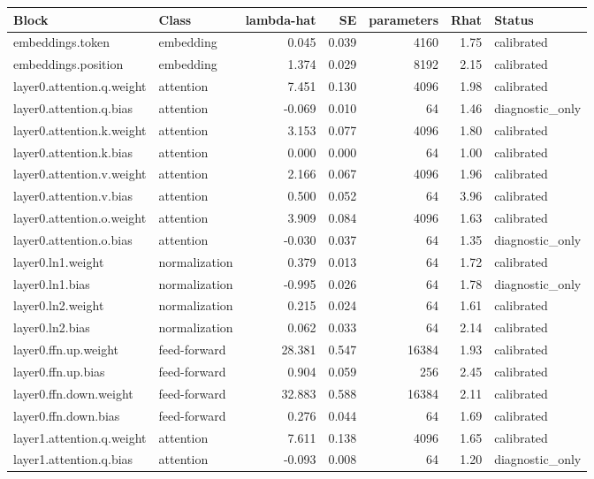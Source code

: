 \documentclass[11pt]{article}
\begin{document}
\small
\begin{longtable}{p{}p{}rrrrp{}}
\toprule
Block & Class & lambda-hat & SE & parameters & Rhat & Status \\
\midrule
\endhead
embeddings.token & embedding & 0.045 & 0.039 & 4160 & 1.75 & calibrated \\
embeddings.position & embedding & 1.374 & 0.029 & 8192 & 2.15 & calibrated \\
layer0.attention.q.weight & attention & 7.451 & 0.130 & 4096 & 1.98 & calibrated \\
layer0.attention.q.bias & attention & -0.069 & 0.010 & 64 & 1.46 & diagnostic\_only \\
layer0.attention.k.weight & attention & 3.153 & 0.077 & 4096 & 1.80 & calibrated \\
layer0.attention.k.bias & attention & 0.000 & 0.000 & 64 & 1.00 & calibrated \\
layer0.attention.v.weight & attention & 2.166 & 0.067 & 4096 & 1.96 & calibrated \\
layer0.attention.v.bias & attention & 0.500 & 0.052 & 64 & 3.96 & calibrated \\
layer0.attention.o.weight & attention & 3.909 & 0.084 & 4096 & 1.63 & calibrated \\
layer0.attention.o.bias & attention & -0.030 & 0.037 & 64 & 1.35 & diagnostic\_only \\
layer0.ln1.weight & normalization & 0.379 & 0.013 & 64 & 1.72 & calibrated \\
layer0.ln1.bias & normalization & -0.995 & 0.026 & 64 & 1.78 & diagnostic\_only \\
layer0.ln2.weight & normalization & 0.215 & 0.024 & 64 & 1.61 & calibrated \\
layer0.ln2.bias & normalization & 0.062 & 0.033 & 64 & 2.14 & calibrated \\
layer0.ffn.up.weight & feed-forward & 28.381 & 0.547 & 16384 & 1.93 & calibrated \\
layer0.ffn.up.bias & feed-forward & 0.904 & 0.059 & 256 & 2.45 & calibrated \\
layer0.ffn.down.weight & feed-forward & 32.883 & 0.588 & 16384 & 2.11 & calibrated \\
layer0.ffn.down.bias & feed-forward & 0.276 & 0.044 & 64 & 1.69 & calibrated \\
layer1.attention.q.weight & attention & 7.611 & 0.138 & 4096 & 1.65 & calibrated \\
layer1.attention.q.bias & attention & -0.093 & 0.008 & 64 & 1.20 & diagnostic\_only \\

\end{longtable}
\end{document}
